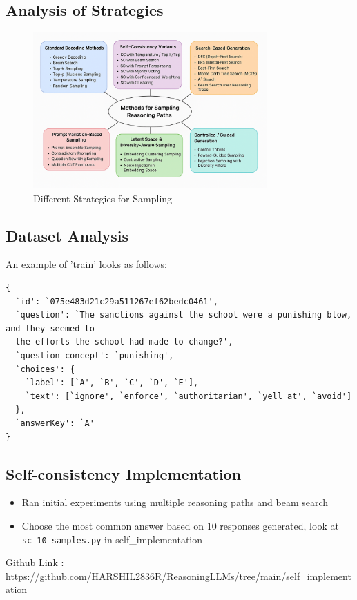 \documentclass[24pt]{article}
\begin{document}
\subsection{Analysis of Strategies}
\begin{figure}[h]
    \centering
    \includegraphics[width=0.8\textwidth]{diagram.png}
    \caption{Different Strategies for Sampling}
    \label{}
\end{figure}
    
\subsection{Dataset Analysis}
An example of 'train' looks as follows:
\begin{verbatim}
{
  `id': `075e483d21c29a511267ef62bedc0461',
  `question': `The sanctions against the school were a punishing blow, and they seemed to _____ 
  the efforts the school had made to change?',
  `question_concept': `punishing',
  `choices': {
    `label': [`A', `B', `C', `D', `E'],
    `text': [`ignore', `enforce', `authoritarian', `yell at', `avoid']
  },
  `answerKey': `A'
}
\end{verbatim}


\subsection{Self-consistency Implementation} 
\begin{itemize}
    \item Ran initial experiments using multiple reasoning paths and beam search
    \item Choose the most common answer based on 10 responses generated, look at \texttt{sc\_10\_samples.py} in self\_implementation
\end{itemize}

\noindent
Github Link : \url{https://github.com/HARSHIL2836R/ReasoningLLMs/tree/main/self_implementation}\\
\end{document}
